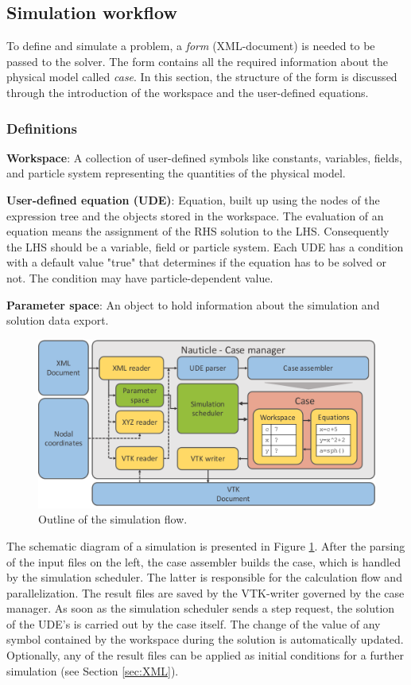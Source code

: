 \documentclass[a4paper,12pt,openany]{book}
\theoremstyle{break}
\begin{document}
\subsection{Simulation workflow} \label{sec:sim_workflow}
To define and simulate a problem, a \textit{form} (XML-document) is needed to be passed to the solver. The form contains all the required information about the physical model called \textit{case}. In this section, the structure of the form is discussed through the introduction of the workspace and the user-defined equations.
\subsubsection{Definitions}
\textbf{Workspace}: A collection of user-defined symbols like constants, variables, fields, and particle system representing the quantities of the physical model.

\textbf{User-defined equation (UDE)}: Equation, built up using the nodes of the expression tree and the objects stored in the workspace. The evaluation of an equation means the assignment of the RHS solution to the LHS. Consequently the LHS should be a variable, field or particle system. Each UDE has a condition with a default value "true" that determines if the equation has to be solved or not. The condition may have particle-dependent value.

\textbf{Parameter space}: An object to hold information about the simulation and solution data export.

\begin{figure}[H]
  \includegraphics[scale=0.55]{workflow.pdf}
  \centering
  \caption{Outline of the simulation flow.}
  \label{fig:workflow}
\end{figure}

The schematic diagram of a simulation is presented in Figure \ref{fig:workflow}. After the parsing of the input files on the left, the case assembler builds the case, which is handled by the simulation scheduler. The latter is responsible for the calculation flow and parallelization. The result files are saved by the VTK-writer governed by the case manager. 
As soon as the simulation scheduler sends a step request, the solution of the UDE's is carried out by the case itself. The change of the value of any symbol contained by the workspace during the solution is automatically updated. Optionally, any of the result files can be applied as initial conditions for a further simulation (see Section \ref{sec:XML}).
\end{document}
